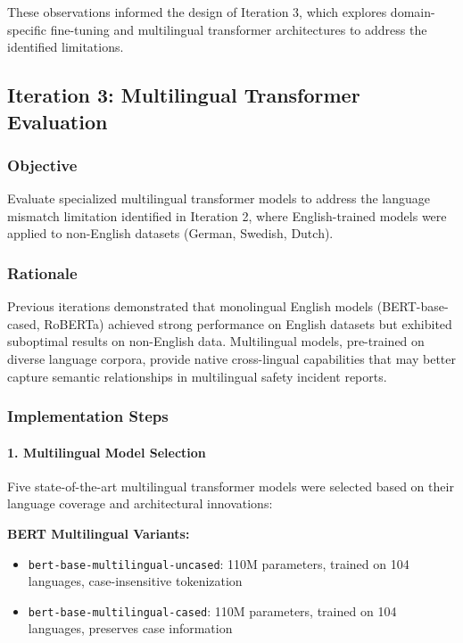 \documentclass[11pt, titlepage, bibliography=totoc]{scrreprt}
\begin{document}
These observations informed the design of Iteration 3, which explores domain-specific fine-tuning and multilingual transformer architectures to address the identified limitations.

\subsection{Iteration 3: Multilingual Transformer Evaluation}

\subsubsection{Objective}
Evaluate specialized multilingual transformer models to address the language mismatch limitation identified in Iteration 2, where English-trained models were applied to non-English datasets (German, Swedish, Dutch).

\subsubsection{Rationale}
Previous iterations demonstrated that monolingual English models (BERT-base-cased, RoBERTa) achieved strong performance on English datasets but exhibited suboptimal results on non-English data. Multilingual models, pre-trained on diverse language corpora, provide native cross-lingual capabilities that may better capture semantic relationships in multilingual safety incident reports.

\subsubsection{Implementation Steps}

\paragraph{1. Multilingual Model Selection}
Five state-of-the-art multilingual transformer models were selected based on their language coverage and architectural innovations:

\textbf{BERT Multilingual Variants:}
\begin{itemize}
    \item \texttt{bert-base-multilingual-uncased}: 110M parameters, trained on 104 languages, case-insensitive tokenization
    \item \texttt{bert-base-multilingual-cased}: 110M parameters, trained on 104 languages, preserves case information
\end{itemize}
\end{document}
